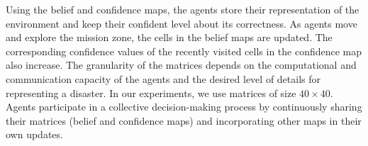 \documentclass[runningheads]{llncs}%
\begin{document}
Using the belief and confidence maps, the agents store their representation of the environment and keep their confident level about its correctness. As agents move and explore the mission zone, the cells in the belief maps are updated. %
The corresponding confidence values of the recently visited cells in the confidence map {also increase. }
The granularity of the matrices depends on the computational and communication capacity of the agents and the desired level of details for representing a disaster. In our experiments, we use matrices of size $40\times40$. Agents participate in a collective decision-making process by continuously sharing their matrices (belief and confidence maps) and incorporating other maps in their own updates. 
\end{document}
